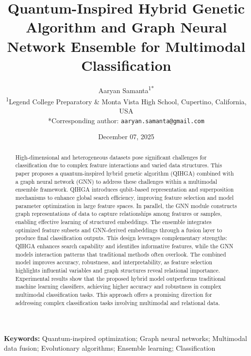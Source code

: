 \documentclass[11pt,a4paper]{article}
\title{Quantum-Inspired Hybrid Genetic Algorithm and Graph Neural Network Ensemble for Multimodal Classification}
\author{Aaryan Samanta\textsuperscript{1*}\\
\textsuperscript{1}Legend College Preparatory \& Monta Vista High School, Cupertino, California, USA\\
*Corresponding author: \texttt{aaryan.samanta@gmail.com}}
\date{December 07, 2025}
\begin{document}
\maketitle

\begin{abstract}
High-dimensional and heterogeneous datasets pose significant challenges for classification due to complex feature interactions and varied data structures. This paper proposes a quantum-inspired hybrid genetic algorithm (QIHGA) combined with a graph neural network (GNN) to address these challenges within a multimodal ensemble framework. QIHGA introduces qubit-based representation and superposition mechanisms to enhance global search efficiency, improving feature selection and model parameter optimization in large feature spaces. In parallel, the GNN module constructs graph representations of data to capture relationships among features or samples, enabling effective learning of structured embeddings. The ensemble integrates optimized feature subsets and GNN-derived embeddings through a fusion layer to produce final classification outputs. This design leverages complementary strengths: QIHGA enhances search capability and identifies informative features, while the GNN models interaction patterns that traditional methods often overlook. The combined model improves accuracy, robustness, and interpretability, as feature selection highlights influential variables and graph structures reveal relational importance. Experimental results show that the proposed hybrid model outperforms traditional machine learning classifiers, achieving higher accuracy and robustness in complex multimodal classification tasks. This approach offers a promising direction for addressing complex classification tasks involving multimodal and relational data.
\end{abstract}

\textbf{Keywords:} Quantum-inspired optimization; Graph neural networks; Multimodal data fusion; Evolutionary algorithms; Ensemble learning; Classification
\end{document}
